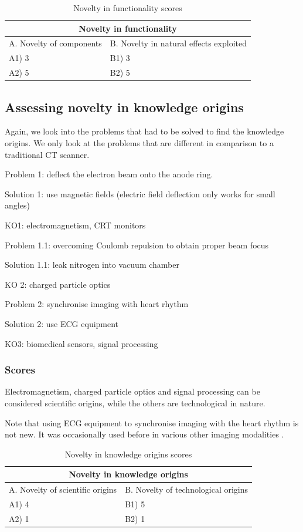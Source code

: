 \begin{table}[h]
\centering
\begin{tabular}{l l}
\hline
\multicolumn{2}{|c|}{Novelty in functionality} \\
\hline
A. Novelty of components & B. Novelty in natural effects exploited\\
A1) 3 & B1) 3\\ 
A2) 5 & B2) 5\\ 
\hline
\end{tabular}
\caption{Novelty in functionality scores}
\label{tbl:funcscores2}
\end{table}

\subsection{Assessing novelty in knowledge origins}
Again, we look into the problems that had to be solved to find the knowledge
origins. We only look at the problems that are different in comparison to a
traditional CT scanner.

Problem 1: deflect the electron beam onto the anode ring.

Solution 1: use magnetic fields (electric field deflection only works for small angles)

KO1: electromagnetism, CRT monitors

Problem 1.1: overcoming Coulomb repulsion to obtain proper beam focus

Solution 1.1: leak nitrogen into vacuum chamber \cite{ebctelectric}

KO 2: charged particle optics

Problem 2: synchronise imaging with heart rhythm

Solution 2: use ECG equipment

KO3: biomedical sensors, signal processing

\subsubsection{Scores}
Electromagnetism, charged particle optics and signal processing can be
considered scientific origins, while the others are technological in nature.

Note that using ECG equipment to synchronise imaging with the heart rhythm is
not new. It was occasionally used before in various other imaging modalities
\cite{suetens}.

\begin{table}[h]
\centering
\begin{tabular}{l l}
\hline
\multicolumn{2}{|c|}{Novelty in knowledge origins} \\
\hline
A. Novelty of scientific origins & B. Novelty of technological origins\\
A1) 4 & B1) 5\\ 
A2) 1 & B2) 1\\ 
\hline
\end{tabular}
\caption{Novelty in knowledge origins scores}
\label{tbl:origscores2}
\end{table}

